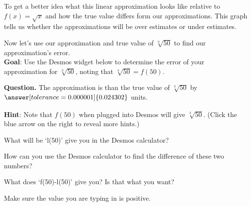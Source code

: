 \documentclass[handout,nooutcomes]{ximera}
\begin{document}
\begin{example}
\begin{explanation}
\medskip

To get a better idea what this linear approximation looks like relative to
$f(x)=\sqrt{x}$ and how the true value differs form our approximations.
This graph tells us whether the approximations will be over estimates or
under estimates.\\



\begin{image}
\end{image}

Now let's use our approximation and true value of $\sqrt[3]{50}$ to
find our approximation's error.\\


\textbf{Goal}: Use the Desmos widget below to determine the error of your approximation for $\sqrt[3]{50}$, noting that $\sqrt[3]{50} = f(50)$.

\textbf{Question. } The approximation is 
than the true value of $\sqrt[3]{50}$ by $\answer[tolerance=0.000001]{0.024302}$ units.\\

$\phantom{.}$\\
\bigskip

\textbf{Hint}: Note that $f(50)$ when plugged into Desmos will give $\sqrt[3]{50}$.
(Click the blue arrow on the right to reveal more hints.)

\begin{expandable}
What will be `l(50)' give you in the Desmos calculator?
\begin{expandable}
How can you use the Desmos calculator to find the difference of these two numbers?
\begin{expandable}
What does `f(50)-l(50)' give you? Is that what you want?
\begin{expandable}
Make sure the value you are typing in is positive.
\end{expandable}
\end{expandable}
\end{expandable}
\end{expandable}


\end{explanation}
\end{example}
\end{document}
